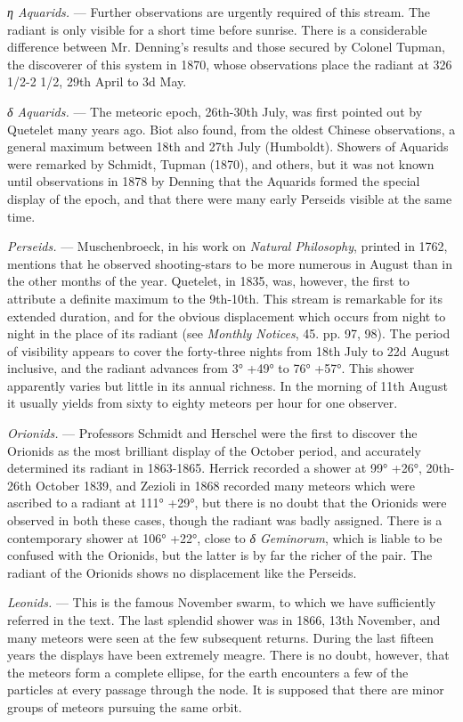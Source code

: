 \documentclass[a4paper, 12pt, oneside, polutonikogreek, english]{article}
\begin{document}
\emph{η Aquarids.} --- Further observations are urgently required of this stream. The radiant is only visible for a short time before sunrise. There is a considerable difference between Mr. Denning's results and those secured by Colonel Tupman, the discoverer of this system in 1870, whose observations place the radiant at 326 1/2-2 1/2, 29th April to 3d May.

\emph{δ Aquarids.} --- The meteoric epoch, 26th-30th July, was first pointed out by Quetelet many years ago. Biot also found, from the oldest Chinese observations, a general maximum between 18th and 27th July (Humboldt). Showers of Aquarids were remarked by Schmidt, Tupman (1870), and others, but it was not known until observations in 1878 by Denning that the Aquarids formed the special display of the epoch, and that there were many early Perseids visible at the same time.

\emph{Perseids.} --- Muschenbroeck, in his work on \emph{Natural Philosophy}, printed in 1762, mentions that he observed shooting-stars to be more numerous in August than in the other months of the year. Quetelet, in 1835, was, however, the first to attribute a definite maximum to the 9th-10th. This stream is remarkable for its extended duration, and for the obvious displacement which occurs from night to night in the place of its radiant (see \emph{Monthly Notices}, 45. pp. 97, 98). The period of visibility appears to cover the forty-three nights from 18th July to 22d August inclusive, and the radiant advances from 3° +49° to 76° +57°. This shower apparently varies but little in its annual richness. In the morning of 11th August it usually yields from sixty to eighty meteors per hour for one observer.

\emph{Orionids.} --- Professors Schmidt and Herschel were the first to discover the Orionids as the most brilliant display of the October period, and accurately determined its radiant in 1863-1865. Herrick recorded a shower at 99° +26°, 20th-26th October 1839, and Zezioli in 1868 recorded many meteors which were ascribed to a radiant at 111° +29°, but there is no doubt that the Orionids were observed in both these cases, though the radiant was badly assigned. There is a contemporary shower at 106° +22°, close to \emph{δ Geminorum}, which is liable to be confused with the Orionids, but the latter is by far the richer of the pair. The radiant of the Orionids shows no displacement like the Perseids.

\emph{Leonids.} --- This is the famous November swarm, to which we have sufficiently referred in the text. The last splendid shower was in 1866, 13th November, and many meteors were seen at the few subsequent returns. During the last fifteen years the displays have been extremely meagre. There is no doubt, however, that the meteors form a complete ellipse, for the earth encounters a few of the particles at every passage through the node. It is supposed that there are minor groups of meteors pursuing the same orbit.
\end{document}

